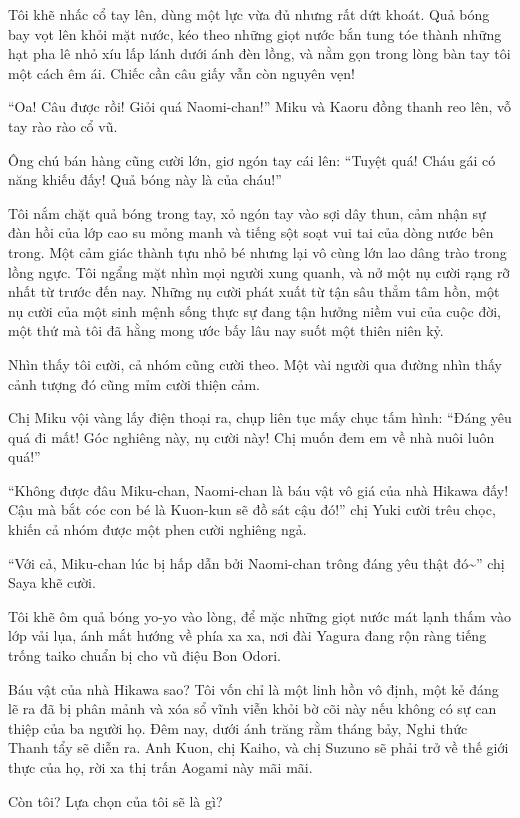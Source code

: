 \documentclass[../main.tex]{subfiles}
\begin{document}
Tôi khẽ nhấc cổ tay lên, dùng một lực vừa đủ nhưng rất dứt khoát. Quả bóng bay vọt lên khỏi mặt nước, kéo theo những giọt nước bắn tung tóe thành những hạt pha lê nhỏ xíu lấp lánh dưới ánh đèn lồng, và nằm gọn trong lòng bàn tay tôi một cách êm ái. Chiếc cần câu giấy vẫn còn nguyên vẹn!

``Oa! Câu được rồi! Giỏi quá Naomi-chan!'' Miku và Kaoru đồng thanh reo lên, vỗ tay rào rào cổ vũ.

Ông chú bán hàng cũng cười lớn, giơ ngón tay cái lên: ``Tuyệt quá! Cháu gái có năng khiếu đấy! Quả bóng này là của cháu!''

Tôi nắm chặt quả bóng trong tay, xỏ ngón tay vào sợi dây thun, cảm nhận sự đàn hồi của lớp cao su mỏng manh và tiếng sột soạt vui tai của dòng nước bên trong. Một cảm giác thành tựu nhỏ bé nhưng lại vô cùng lớn lao dâng trào trong lồng ngực. Tôi ngẩng mặt nhìn mọi người xung quanh, và nở một nụ cười rạng rỡ nhất từ trước đến nay. Những nụ cười phát xuất từ tận sâu thẳm tâm hồn, một nụ cười của một sinh mệnh sống thực sự đang tận hưởng niềm vui của cuộc đời, một thứ mà tôi đã hằng mong ước bấy lâu nay suốt một thiên niên kỷ.

Nhìn thấy tôi cười, cả nhóm cũng cười theo. Một vài người qua đường nhìn thấy cảnh tượng đó cũng mỉm cười thiện cảm.

Chị Miku vội vàng lấy điện thoại ra, chụp liên tục mấy chục tấm hình: ``Đáng yêu quá đi mất! Góc nghiêng này, nụ cười này! Chị muốn đem em về nhà nuôi luôn quá!''

``Không được đâu Miku-chan, Naomi-chan là báu vật vô giá của nhà Hikawa đấy! Cậu mà bắt cóc con bé là Kuon-kun sẽ đồ sát cậu đó!'' chị Yuki cười trêu chọc, khiến cả nhóm được một phen cười nghiêng ngả.

``Với cả, Miku-chan lúc bị hấp dẫn bởi Naomi-chan trông đáng yêu thật đó\~{}'' chị Saya khẽ cười.

Tôi khẽ ôm quả bóng yo-yo vào lòng, để mặc những giọt nước mát lạnh thấm vào lớp vải lụa, ánh mắt hướng về phía xa xa, nơi đài Yagura đang rộn ràng tiếng trống taiko chuẩn bị cho vũ điệu Bon Odori.

Báu vật của nhà Hikawa sao? Tôi vốn chỉ là một linh hồn vô định, một kẻ đáng lẽ ra đã bị phân mảnh và xóa sổ vĩnh viễn khỏi bờ cõi này nếu không có sự can thiệp của ba người họ. Đêm nay, dưới ánh trăng rằm tháng bảy, Nghi thức Thanh tẩy sẽ diễn ra. Anh Kuon, chị Kaiho, và chị Suzuno sẽ phải trở về thế giới thực của họ, rời xa thị trấn Aogami này mãi mãi.

Còn tôi? Lựa chọn của tôi sẽ là gì?
\end{document}
